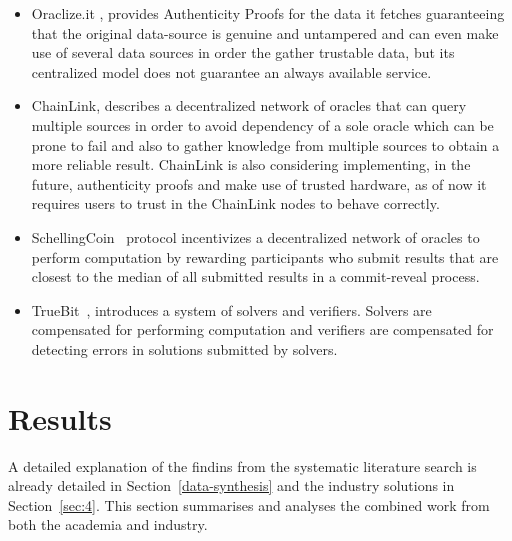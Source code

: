 \documentclass[final,3p,12pt,twocolumn]{elsarticle}
\begin{document}
\begin{itemize}
  \item Oraclize.it \cite{Oraclize.it2018}, provides Authenticity Proofs for the data it fetches guaranteeing that the original data-source is genuine and untampered and can even make use of several data sources in order the gather trustable data, but its centralized model does not guarantee an always available service.
  \item ChainLink\cite{Ellis2017}, describes a decentralized network of oracles that can query multiple sources in order to avoid dependency of a sole oracle which can be prone to fail and also to gather knowledge from multiple sources to obtain a more reliable result. ChainLink is also considering implementing, in the future, authenticity proofs and make use of trusted hardware, as of now it requires users to trust in the ChainLink nodes to behave correctly.
  \item SchellingCoin~\cite{VitalikButerin2014} protocol incentivizes a decentralized network of oracles to perform computation by rewarding participants who submit results that are closest to the median of all submitted results in a commit-reveal process.
  \item TrueBit~\cite{Teutsch2017}, introduces a system of solvers and verifiers. Solvers are compensated for performing computation and verifiers are compensated for detecting errors in solutions submitted by solvers.
\end{itemize}

\section{Results}\label{sec:5}


A detailed explanation of the findins from the systematic literature search is already detailed in Section~\ref{data-synthesis} and the industry solutions in Section~\ref{sec:4}. This section summarises and analyses the combined work from both the academia and industry.
\end{document}
